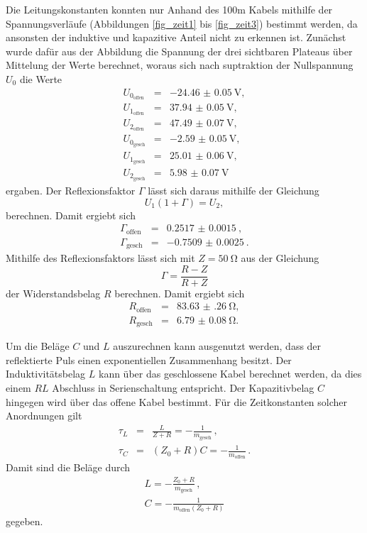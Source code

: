 Die Leitungskonstanten konnten nur Anhand des 100m Kabels mithilfe der Spannungsverläufe (Abbildungen \ref{fig_zeit1} bis \ref{fig_zeit3}) bestimmt werden, da ansonsten der induktive und kapazitive Anteil nicht zu erkennen ist.
Zunächst wurde dafür aus der Abbildung die Spannung der drei sichtbaren Plateaus über Mittelung der Werte berechnet, woraus sich nach suptraktion der Nullspannung $U_0$ die Werte
\begin{eqnarray*}
	U_{0_\text{offen}} &=& \SI{-24.46(5)}{\volt},\\
	U_{1_\text{offen}} &=& \SI{37.94(5)}{\volt},\\
	U_{2_\text{offen}} &=& \SI{47.49(7)}{\volt},\\
	U_{0_\text{gesch}} &=& \SI{-2.59(5)}{\volt},\\
	U_{1_\text{gesch}} &=& \SI{25.01(6)}{\volt},\\
	U_{2_\text{gesch}} &=& \SI{5.98(7)}{\volt}
\end{eqnarray*}
ergaben.
Der Reflexionsfaktor $\Gamma$ lässt sich daraus mithilfe der Gleichung
\begin{equation*}
	U_1 (1+\Gamma) = U_2,
\end{equation*}
 berechnen.
Damit ergiebt sich
\begin{eqnarray*}
	\Gamma_\text{offen} &=& \SI{0.2517(15)}{},\\
	\Gamma_\text{gesch} &=& \SI{-0.7509(25)}{}.
\end{eqnarray*}
Mithilfe des Reflexionsfaktors lässt sich mit $Z=\SI{50}{\ohm}$ aus der Gleichung
\begin{equation*}
	\Gamma = \frac{R-Z}{R+Z}
\end{equation*}
der Widerstandsbelag $R$ berechnen.
Damit ergiebt sich
\begin{eqnarray*}
	R_\text{offen} &=& \SI{83.63(26)}{\ohm},\\
	R_\text{gesch} &=& \SI{6.79(8)}{\ohm}.
\end{eqnarray*}

Um die Beläge $C$ und $L$ auszurechnen kann ausgenutzt werden, dass der reflektierte Puls einen exponentiellen Zusammenhang besitzt.
Der Induktivitätsbelag $L$ kann über das geschlossene Kabel berechnet werden, da dies einem $RL$ Abschluss in Serienschaltung entspricht.
Der Kapazitivbelag $C$ hingegen wird über das offene Kabel bestimmt.
Für die Zeitkonstanten solcher Anordnungen gilt
\begin{eqnarray*}
	\tau_L &=& \frac{L}{Z+R} = -\frac{1}{m_\text{gesch}}\,, \\
	\tau_C &=& (Z_0 + R) C = -\frac{1}{m_\text{offen}}\,.
\end{eqnarray*}
Damit sind die Beläge durch
\begin{eqnarray*}
	L = -\frac{Z_0 + R}{m_\text{gesch}} \,,\\
	C = -\frac{1}{m_\text{offen} (Z_0 + R)}
\end{eqnarray*}
gegeben.

